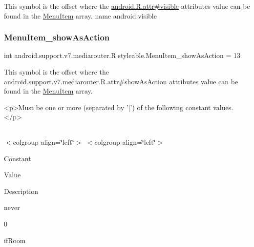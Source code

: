 This symbol is the offset where the \hyperlink{}{android.\+R.\+attr\#visible} attribute\textquotesingle{}s value can be found in the \hyperlink{classandroid_1_1support_1_1v7_1_1mediarouter_1_1R_1_1styleable_ab3f2d4af0d17a47efacf7fd82df9528d}{Menu\+Item} array.  name android\+:visible \mbox{\label{classandroid_1_1support_1_1v7_1_1mediarouter_1_1R_1_1styleable_ab4d2223f247d789c35977fff5fedfcca}} 
\subsubsection{\texorpdfstring{Menu\+Item\+\_\+show\+As\+Action}{MenuItem\_showAsAction}}
{\footnotesize\ttfamily int android.\+support.\+v7.\+mediarouter.\+R.\+styleable.\+Menu\+Item\+\_\+show\+As\+Action = 13\hspace{0.3cm}{\ttfamily [static]}}

This symbol is the offset where the \hyperlink{classandroid_1_1support_1_1v7_1_1mediarouter_1_1R_1_1attr_acab72cb74472022e2dbb10ab9c0eb017}{android.\+support.\+v7.\+mediarouter.\+R.\+attr\#show\+As\+Action} attribute\textquotesingle{}s value can be found in the \hyperlink{classandroid_1_1support_1_1v7_1_1mediarouter_1_1R_1_1styleable_ab3f2d4af0d17a47efacf7fd82df9528d}{Menu\+Item} array.

\begin{DoxyVerb}      <p>Must be one or more (separated by '|') of the following constant values.</p>
\end{DoxyVerb}
 \tabulinesep=1mm
\begin{longtabu} spread 0pt [c]{*{0}{|X[-1]}|}
\hline
\end{longtabu}
$<$colgroup align=\char`\"{}left\char`\"{}$>$ $<$colgroup align=\char`\"{}left\char`\"{}$>$ 

Constant

Value

Description 

{\ttfamily never}

0

{\ttfamily if\+Room}


